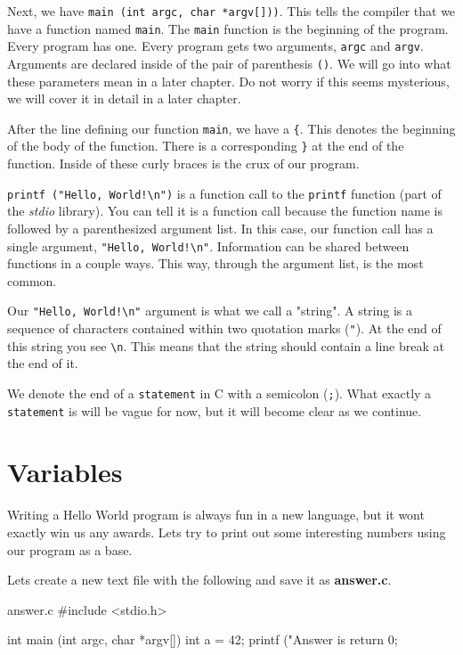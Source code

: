 \documentclass[12pt]{article}
\newcommand{\file}[1]{{\bf\ttfamily #1}}
\newcommand{\ident}[1]{{\it\ttfamily #1}}
\begin{document}
Next, we have \verb|main (int argc, char *argv[]))|. This tells the compiler
that we have a function named \verb|main|. The \verb|main| function is the
beginning of the program.  Every program has one. Every program gets two
arguments, \verb|argc| and \verb|argv|. Arguments are declared inside of the
pair of parenthesis \verb|()|. We will go into what these parameters mean in a
later chapter. Do not worry if this seems mysterious, we will cover it in detail
in a later chapter.

After the line defining our function \verb|main|, we have a \verb|{|. This
denotes the beginning of the body of the function. There is a corresponding
\verb|}| at the end of the function. Inside of these curly braces is the crux
of our program.

\verb|printf ("Hello, World!\n")| is a function call to the \verb|printf|
function (part of the \ident{stdio} library). You can tell it is a function call
because the function name is followed by a parenthesized argument list.  In this
case, our function call has a single argument, \verb|"Hello, World!\n"|.
Information can be shared between functions in a couple ways. This way, through
the argument list, is the most common.

Our \verb|"Hello, World!\n"| argument is what we call a "string". A string is a
sequence of characters contained within two quotation marks (\verb|"|).  At the
end of this string you see \verb|\n|.  This means that the string should contain
a line break at the end of it.

We denote the end of a \verb|statement| in C with a semicolon (\verb|;|).
What exactly a \verb|statement| is will be vague for now, but it will become
clear as we continue.

\section{Variables}

Writing a Hello World program is always fun in a new language, but it wont
exactly win us any awards. Lets try to print out some interesting numbers
using our program as a base.

Lets create a new text file with the following and save it as \file{answer.c}.

\begin{code}{answer.c}
#include <stdio.h>

int
main (int   argc,
      char *argv[])
{
    int a = 42;
    printf ("Answer is %
    return 0;
}
\end{code}
\end{document}

